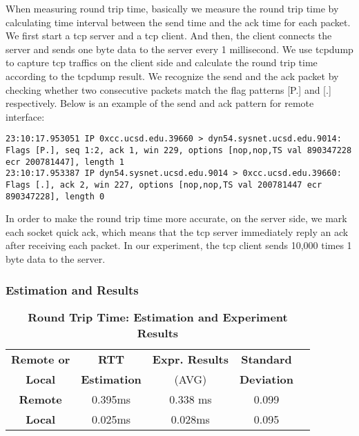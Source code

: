 When measuring round trip time, basically we measure the round trip time by calculating time interval between the send time and the ack time for each packet. We first start a tcp server and a tcp client. And then, the client connects the server and sends one byte data to the server every 1 millisecond. We use tcpdump to capture tcp traffics on the client side and calculate the round trip time according to the tcpdump result.  We recognize the send and the ack packet by checking whether two consecutive packets match the flag patterns [P.] and [.] respectively. Below is an example of the send and ack pattern for remote interface:

\begin{lstlisting}
23:10:17.953051 IP 0xcc.ucsd.edu.39660 > dyn54.sysnet.ucsd.edu.9014: Flags [P.], seq 1:2, ack 1, win 229, options [nop,nop,TS val 890347228 ecr 200781447], length 1
23:10:17.953387 IP dyn54.sysnet.ucsd.edu.9014 > 0xcc.ucsd.edu.39660: Flags [.], ack 2, win 227, options [nop,nop,TS val 200781447 ecr 890347228], length 0
\end{lstlisting}

In order to make the round trip time more accurate, on the server side, we mark each socket quick ack, which means that the tcp server immediately reply an ack after receiving each packet. In our experiment, the tcp client sends 10,000 times 1 byte data to the server.

\subsubsection{Estimation and Results}

\begin{table}[ht]
  \centering
  \caption{\textbf{Round Trip Time: Estimation and Experiment Results}}
  \begin{threeparttable}
  \begin{tabular}{ccccc}
  \hline
      \textbf{Remote or} & \textbf{RTT}   & \textbf{Expr. Results} & \textbf{Standard}\\
      \textbf{Local}   &  \textbf{Estimation}  & (AVG)   & \textbf{Deviation} \\
  \hline
      \textbf{Remote}  & 0.395ms & 0.338 ms & 0.099 \\
      \textbf{Local} & 0.025ms & 0.028ms & 0.095 \\
  \hline
  \end{tabular}
  \end{threeparttable}
  \label{round_trip_time_table}
\end{table}

